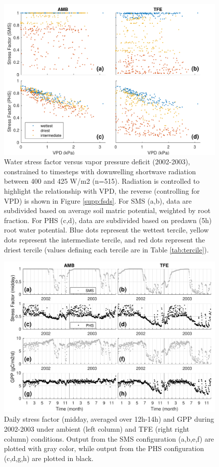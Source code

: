 \documentclass[draft,linenumbers]{agujournal}
\begin{document}
      \clearpage
    \begin{figure}[h]
     \centering
     \includegraphics[width=30pc]{../figs3/vpdstress.pdf}
     \caption{Water stress factor versus vapor pressure deficit (2002-2003), constrained to timesteps with downwelling shortwave radiation between 400 and 425 W/m2 (n=515).
     Radiation is controlled to highlight the relationship with VPD, the reverse (controlling for VPD) is shown in Figure \ref{supp:fsds}.
     For SMS (a,b), data are subdivided based on average soil matric potential, weighted by root fraction.
     For PHS (c,d), data are subdivided based on predawn (5h) root water potential.
     Blue dots represent the wettest tercile, yellow dots represent the intermediate tercile, and red dots represent the driest tercile (values defining each tercile are in Table \ref{tab:tercile}).
     }
     \label{fig:stress2}
       \end{figure}
      
          \clearpage   
  \begin{figure}[h]
     \centering
     \includegraphics[width=30pc]{../figs3/gpp.pdf}
     \caption{Daily stress factor (midday, averaged over 12h-14h) and GPP during 2002-2003 under ambient (left column) and TFE (right right column) conditions.
     Output from the SMS configuration (a,b,e,f) are plotted with gray color, while output from the PHS configuration (c,d,g,h) are plotted in black.
     }
     \label{fig:gpp}
  \end{figure} 
         
\end{document}
